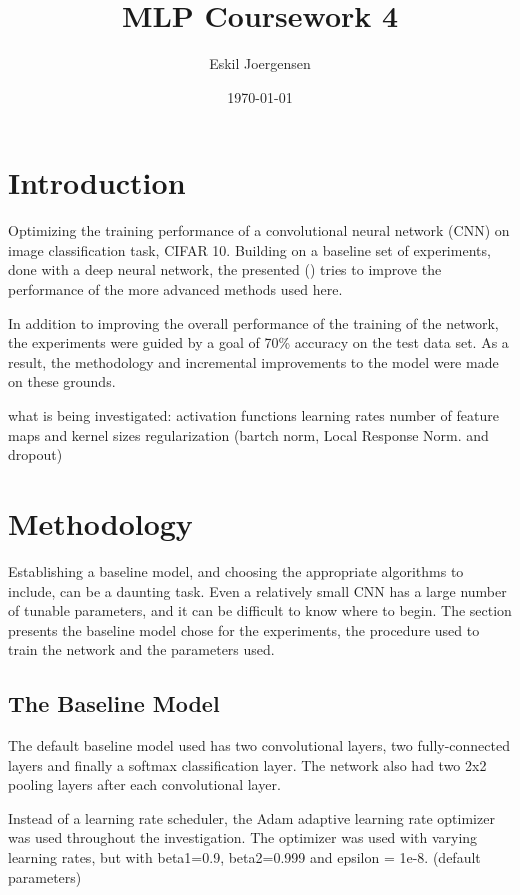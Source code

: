 \documentclass[]{article}
\title{MLP Coursework 4}
\author{Eskil Joergensen}
\date{\today}
\begin{document}
\maketitle

\section{Introduction}

Optimizing the training performance of a convolutional neural network (CNN) on image classification task, CIFAR 10. Building on a baseline set of experiments, done with a deep neural network, the presented () tries to improve the performance of the more advanced methods used here. 

In addition to improving the overall performance of the training of the network, the experiments were guided by a goal of 70\% accuracy on the test data set. As a result, the methodology and incremental improvements to the model were made on these grounds. 


what is being investigated:
activation functions
learning rates
number of feature maps and kernel sizes
regularization (bartch norm, Local Response Norm. and dropout)



\section{Methodology}

Establishing a baseline model, and choosing the appropriate algorithms to include, can be a daunting task. Even a relatively small CNN has a large number of tunable parameters, and it can be difficult to know where to begin. The section presents the baseline model chose for the experiments, the procedure used to train the network and the parameters used. 

\subsection{The Baseline Model}

The default baseline model used has two convolutional layers, two fully-connected layers and finally a softmax classification layer. The network also had two 2x2 pooling layers after each convolutional layer. 

Instead of a learning rate scheduler, the Adam adaptive learning rate optimizer was used throughout the investigation. The optimizer was used with varying learning rates, but with beta1=0.9, beta2=0.999 and epsilon = 1e-8. (default parameters) 
\end{document}
